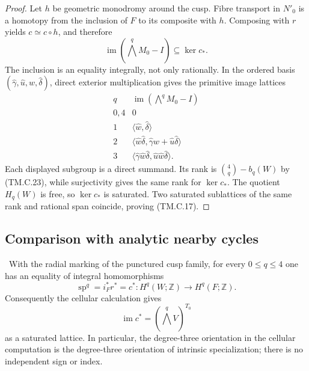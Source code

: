 \begin{proof}
Let $h$ be geometric monodromy around the cusp.  Fibre transport in $N'_0$
is a homotopy from the inclusion of $F$ to its composite with $h$.  Composing
with $r$ yields $c\simeq c\circ h$, and therefore
\[
 \operatorname{im}(\textstyle\bigwedge^qM_0-I)\subseteq\ker c_*.
\tag{TM.C.24}
\]
The inclusion is an equality integrally, not only rationally.  In the ordered
basis $(\widehat\gamma,\widehat u,\widehat w,\widehat\delta)$, direct exterior
multiplication gives the primitive image lattices
\[
\begin{array}{c|c}
q&\operatorname{im}(\bigwedge^qM_0-I)\\ \hline
0,4&0\\
1&\langle\widehat w,\widehat\delta\rangle\\
2&\langle\widehat w\widehat\delta,
          \widehat\gamma\widehat w+\widehat u\widehat\delta\rangle\\
3&\langle\widehat\gamma\widehat w\widehat\delta,
          \widehat u\widehat w\widehat\delta\rangle.
\end{array}
\tag{TM.C.25}
\]
Each displayed subgroup is a direct summand.  Its rank is
$\binom4q-b_q(W)$ by (TM.C.23), while surjectivity gives the same rank for
$\ker c_*$.  The quotient $H_q(W)$ is free, so $\ker c_*$ is saturated.
Two saturated sublattices of the same rank and rational span coincide, proving
(TM.C.17).
\end{proof}

\subsection{Comparison with analytic nearby cycles}

\begin{theorem}
\label{mapsI:top:thm:collapse-equals-specialization}
\ With the radial marking of the punctured cusp family, for every
$0\leq q\leq4$ one has an equality of integral homomorphisms
\[
 \operatorname{sp}^q=i_F^*r^*=c^*:
 H^q(W;\mathbb Z)\longrightarrow H^q(F;\mathbb Z).
\tag{TM.C.26}
\]
Consequently the cellular calculation gives
\[
 \operatorname{im}c^*=(\textstyle\bigwedge^qV)^{T_0}
\]
as a saturated lattice.  In particular, the degree-three orientation in the
cellular computation is the degree-three orientation of intrinsic
specialization; there is no independent sign or index.
\end{theorem}

